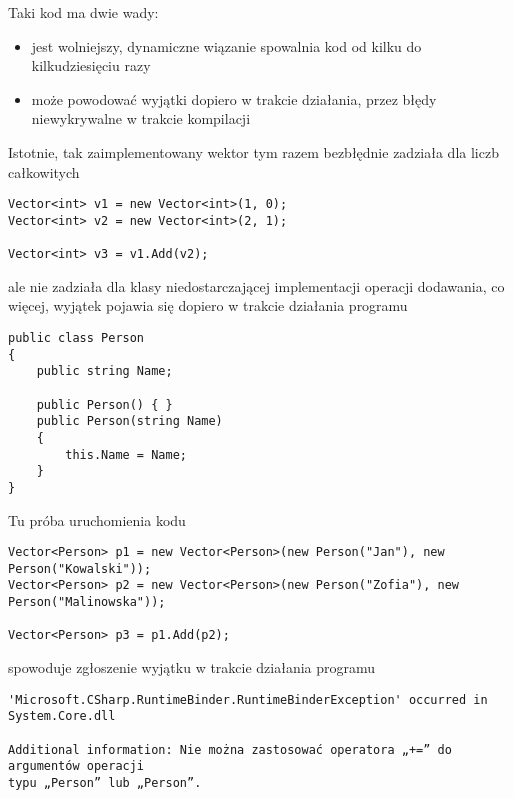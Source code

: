 Taki kod ma dwie wady:
\begin{itemize}
\item jest wolniejszy, dynamiczne wiązanie spowalnia kod od kilku do kilkudziesięciu razy
\item może powodować wyjątki dopiero w trakcie działania, przez błędy niewykrywalne w trakcie kompilacji
\end{itemize}

Istotnie, tak zaimplementowany wektor tym razem bezbłędnie zadziała dla liczb całkowitych

\begin{scriptsize}
\begin{verbatim}
Vector<int> v1 = new Vector<int>(1, 0);
Vector<int> v2 = new Vector<int>(2, 1);

Vector<int> v3 = v1.Add(v2);
\end{verbatim}
\end{scriptsize}

ale nie zadziała dla klasy niedostarczającej implementacji operacji dodawania, co więcej, wyjątek pojawia się 
dopiero w trakcie działania programu

\begin{scriptsize}
\begin{verbatim}
public class Person
{
    public string Name;

    public Person() { }
    public Person(string Name)
    {
        this.Name = Name;
    }
}
\end{verbatim}
\end{scriptsize}

Tu próba uruchomienia kodu

\begin{scriptsize}
\begin{verbatim}
Vector<Person> p1 = new Vector<Person>(new Person("Jan"), new Person("Kowalski"));
Vector<Person> p2 = new Vector<Person>(new Person("Zofia"), new Person("Malinowska"));

Vector<Person> p3 = p1.Add(p2);
\end{verbatim}
\end{scriptsize}

spowoduje zgłoszenie wyjątku w trakcie działania programu

\begin{scriptsize}
\begin{verbatim}
'Microsoft.CSharp.RuntimeBinder.RuntimeBinderException' occurred in System.Core.dll

Additional information: Nie można zastosować operatora „+=” do argumentów operacji 
typu „Person” lub „Person”.
\end{verbatim}
\end{scriptsize}

